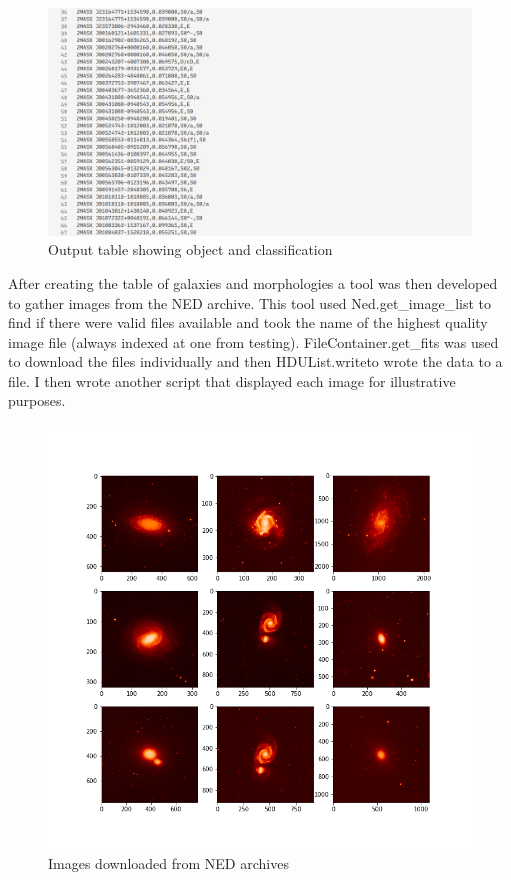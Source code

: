 \documentclass[12pt,runningheads]{llncs}
\begin{document}
\begin{figure}[h]
    \includegraphics[scale=0.3]{Screenshot_2024-02-01_03-39-05.png}
    \centering
    \caption{Output table showing object and classification}\label{tab1}
\end{figure}

\newpage

\noindent After creating the table of galaxies and morphologies a tool was then developed to gather
images from the NED archive. This tool used Ned.get\_image\_list to find if there were valid
files available and took the name of the highest quality image file (always indexed at one
from testing). FileContainer.get\_fits was used to download the files individually and then
HDUList.writeto wrote the data to a file. I then wrote another script that displayed each
image for illustrative purposes.

\begin{figure}[h]
    \includegraphics[scale=0.4]{Figure_1.png}
    \centering
    \caption{Images downloaded from NED archives}\label{tab1}
\end{figure}
\end{document}
